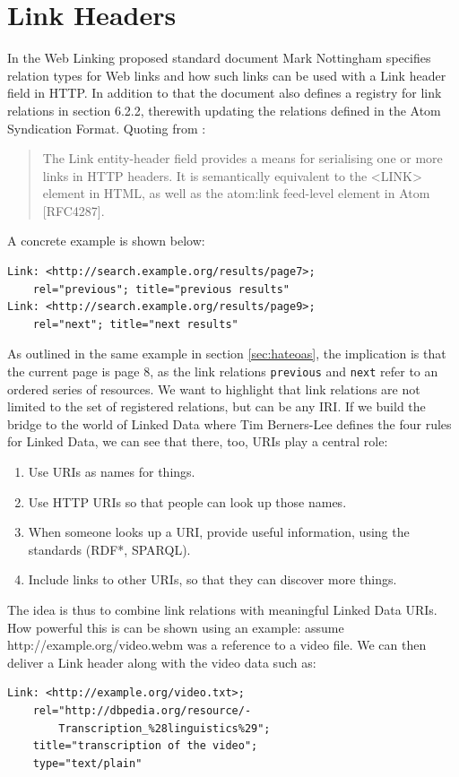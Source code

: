 \documentclass{acm_proc_article-sp}
\begin{document}
\section{Link Headers}\label{sec:linkheaders}
In the Web Linking\cite{Link:Headers} proposed standard document Mark Nottingham specifies relation types for Web links and how such links can be used with a Link header field in HTTP. In addition to that the document also defines a registry for link relations in section 6.2.2, therewith updating the relations defined in the Atom Syndication Format. Quoting from \cite{Link:Headers}:
\begin{quote}
The Link entity-header field provides a means for serialising one or more links in HTTP headers.  It is semantically equivalent to the <LINK> element in HTML, as well as the atom:link feed-level element in Atom [RFC4287].
\end{quote}
A concrete example is shown below:
\begin{verbatim}
Link: <http://search.example.org/results/page7>;
    rel="previous"; title="previous results"
Link: <http://search.example.org/results/page9>;
    rel="next"; title="next results"
\end{verbatim}
As outlined in the same example in section \ref{sec:hateoas}, the implication is that the current page is page 8, as the link relations \texttt{previous} and \texttt{next} refer to an ordered series of resources. We want to highlight that link relations are not limited to the set of registered relations, but can be any IRI. If we build the bridge to the world of Linked Data\cite{TimBL:LinkedData} where Tim Berners-Lee defines the four rules for Linked Data, we can see that there, too, URIs play a central role:
\begin{enumerate}
\item Use URIs as names for things.
\item Use HTTP URIs so that people can look up those names.
\item When someone looks up a URI, provide useful information, using the standards (RDF*, SPARQL).
\item Include links to other URIs, so that they can discover more things.
\end{enumerate}
The idea is thus to combine link relations with meaningful Linked Data URIs. How powerful this is can be shown using an example: assume http://example.org/video.webm was a reference to a video file. We can then deliver a Link header along with the video data such as:
\begin{verbatim}
Link: <http://example.org/video.txt>;
    rel="http://dbpedia.org/resource/-
        Transcription_%28linguistics%29";
    title="transcription of the video";
    type="text/plain"
\end{verbatim}
\end{document}
